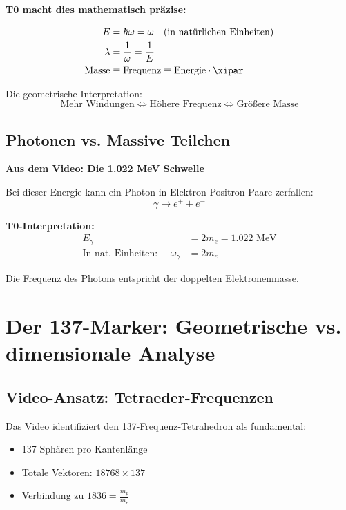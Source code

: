 	\begin{vorteil}
		\textbf{T0 macht dies mathematisch präzise:}
		
		\begin{align}
			E &= \hbar \omega = \omega \quad \text{(in natürlichen Einheiten)} \\
			\lambda &= \frac{1}{\omega} = \frac{1}{E} \\
			\text{Masse} &\equiv \text{Frequenz} \equiv \text{Energie} \cdot \xipar
		\end{align}
		
		Die geometrische Interpretation:
		\begin{equation}
			\boxed{\text{Mehr Windungen} \Leftrightarrow \text{Höhere Frequenz} \Leftrightarrow \text{Größere Masse}}
		\end{equation}
	\end{vorteil}
	
	\subsection{Photonen vs. Massive Teilchen}
	
	\textbf{Aus dem Video: Die 1.022 MeV Schwelle}
	
	Bei dieser Energie kann ein Photon in Elektron-Positron-Paare zerfallen:
	\begin{equation}
		\gamma \rightarrow e^+ + e^-
	\end{equation}
	
	\textbf{T0-Interpretation:}
	\begin{align}
		E_\gamma &= 2 m_e = 1.022 \text{ MeV} \\
		\text{In nat. Einheiten: } \quad \omega_\gamma &= 2 m_e
	\end{align}
	
	Die Frequenz des Photons entspricht der doppelten Elektronenmasse.
	
	\section{Der 137-Marker: Geometrische vs. dimensionale Analyse}
	
	\subsection{Video-Ansatz: Tetraeder-Frequenzen}
	
	Das Video identifiziert den 137-Frequenz-Tetrahedron als fundamental:
	\begin{itemize}
		\item 137 Sphären pro Kantenlänge
		\item Totale Vektoren: $18768 \times 137$
		\item Verbindung zu $1836 = \frac{m_p}{m_e}$
	\end{itemize}
	
